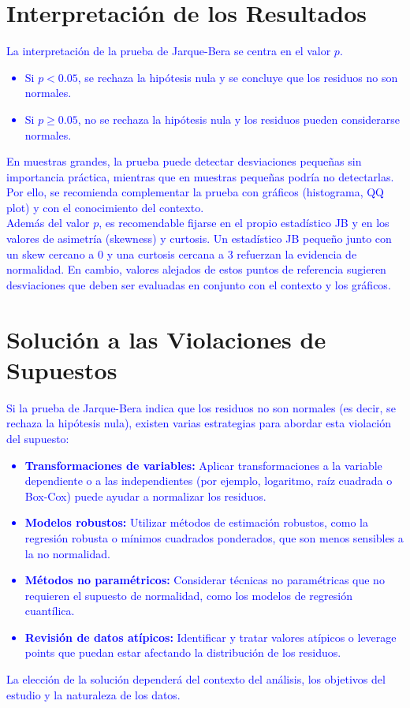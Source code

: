 \documentclass[10pt]{article}
\begin{document}
\section{Interpretación de los Resultados}
    \textcolor{blue}{
        La interpretación de la prueba de Jarque-Bera se centra en el valor $p$. 
        \begin{itemize}
            \item Si $p < 0.05$, se rechaza la hipótesis nula y se concluye que los residuos no son normales.
            \item Si $p \geq 0.05$, no se rechaza la hipótesis nula y los residuos pueden considerarse normales.
        \end{itemize}
        En muestras grandes, la prueba puede detectar desviaciones pequeñas sin importancia práctica, mientras que en muestras pequeñas podría no detectarlas. Por ello, se recomienda complementar la prueba con gráficos (histograma, QQ plot) y con el conocimiento del contexto.\\
        Además del valor $p$, es recomendable fijarse en el propio estadístico JB y en los valores de asimetría (skewness) y curtosis. Un estadístico JB pequeño junto con un skew cercano a 0 y una curtosis cercana a 3 refuerzan la evidencia de normalidad. En cambio, valores alejados de estos puntos de referencia sugieren desviaciones que deben ser evaluadas en conjunto con el contexto y los gráficos.
    }
\section{Solución a las Violaciones de Supuestos}
    \textcolor{blue}{
        Si la prueba de Jarque-Bera indica que los residuos no son normales (es decir, se rechaza la hipótesis nula), existen varias estrategias para abordar esta violación del supuesto:
        \begin{itemize}
            \item \textbf{Transformaciones de variables:} Aplicar transformaciones a la variable dependiente o a las independientes (por ejemplo, logaritmo, raíz cuadrada o Box-Cox) puede ayudar a normalizar los residuos.
            \item \textbf{Modelos robustos:} Utilizar métodos de estimación robustos, como la regresión robusta o mínimos cuadrados ponderados, que son menos sensibles a la no normalidad.
            \item \textbf{Métodos no paramétricos:} Considerar técnicas no paramétricas que no requieren el supuesto de normalidad, como los modelos de regresión cuantílica.
            \item \textbf{Revisión de datos atípicos:} Identificar y tratar valores atípicos o leverage points que puedan estar afectando la distribución de los residuos.
        \end{itemize}
        La elección de la solución dependerá del contexto del análisis, los objetivos del estudio y la naturaleza de los datos.
    }
\end{document}
